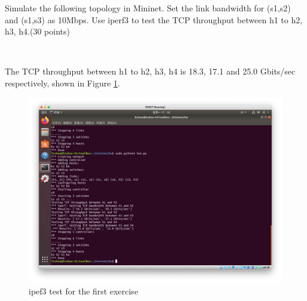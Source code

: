 \begin{exercise}[]{Simulate the following topology in Mininet. Set the link bandwidth for (s1,s2) and (s1,s3) as 10Mbps. Use iperf3 to test the TCP throughput between h1 to h2, h3, h4.(30 points)
    }
  \begin{solution}
  \par{~}
  \end{solution}

The TCP throughput between h1 to h2, h3, h4 is 18.3, 17.1 and 25.0 Gbits/sec respectively, shown in Figure \ref{fig:ex1}.

\begin{figure}[hb]
  \begin{center}
  \includegraphics[width=12cm]{img/lab2/ex1}
  \caption{ipef3 test for the first exercise}
  \label{fig:ex1}
  \end{center}
\end{figure}

  \label{ex1}
\end{exercise}


